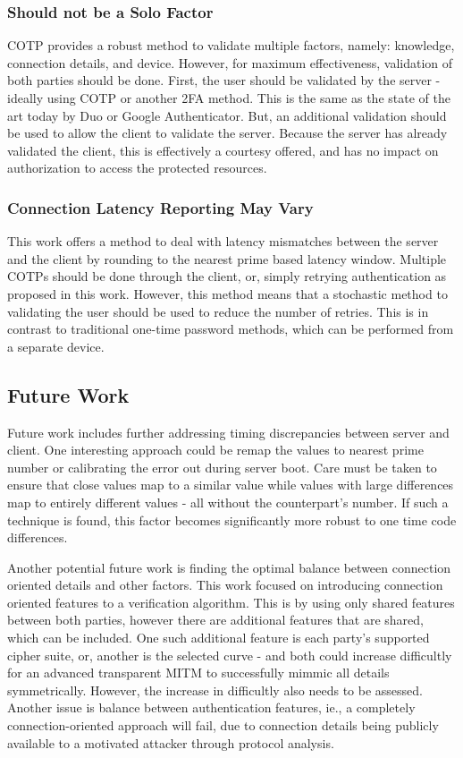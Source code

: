 \documentclass[a4paper, 11pt]{article} 				%
\begin{document}
\subsubsection{Should not be a Solo Factor}
COTP provides a robust method to validate multiple factors, namely: knowledge, connection details, and device. However, for maximum effectiveness, validation of both parties should be done. First, the user should be validated by the server - ideally using COTP or another 2FA method. This is the same as the state of the art today by Duo or Google Authenticator. But, an additional validation should be used to allow the client to validate the server. Because the server has already validated the client, this is effectively a courtesy offered, and has no impact on authorization to access the protected resources.

\subsubsection{Connection Latency Reporting May Vary}
This work offers a method to deal with latency mismatches between the server and the client by rounding to the nearest prime based latency window. Multiple COTPs should be done through the client, or, simply retrying authentication as proposed in this work. However, this method means that a stochastic method to validating the user should be used to reduce the number of retries. This is in contrast to traditional one-time password methods, which can be performed from a separate device. 

\subsection{Future Work}
Future work includes further addressing timing discrepancies between server and client. One interesting approach could be remap the values to nearest prime number or calibrating the error out during server boot. Care must be taken to ensure that close values map to a similar value while values with large differences map to entirely different values - all without the counterpart's number. If such a technique is found, this factor becomes significantly more robust to one time code differences.

Another potential future work is finding the optimal balance between connection oriented details and other factors. This work focused on introducing connection oriented features to a verification algorithm. This is by using only shared features between both parties, however there are additional features that are shared, which can be included. One such additional feature is each party's supported cipher suite, or, another is the selected curve - and both could increase difficultly for an advanced transparent MITM to successfully mimmic all details symmetrically. However, the increase in difficultly also needs to be assessed. Another issue is balance between authentication features, ie., a completely connection-oriented approach will fail, due to connection details being publicly available to a motivated attacker through protocol analysis.
\end{document}
